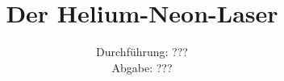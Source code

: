 

\subject{Versuch 61}
\title{Der Helium-Neon-Laser}
\date{Durchführung: ???\\
      Abgabe: ???}



\maketitle
\newpage







\printbibliography


